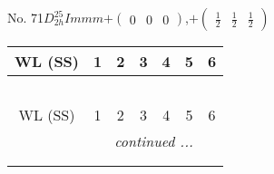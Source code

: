 \documentclass[fleqn,9pt,landscape]{jsarticle}
\begin{document}
\newpage
No. 71\quad$D_{2h}^{25}$\quad$Immm$\quad[ orthorhombic ]\quad$+\begin{pmatrix} 0 & 0 & 0 \end{pmatrix}$,\quad $+\begin{pmatrix} \frac{1}{2} & \frac{1}{2} & \frac{1}{2} \end{pmatrix}$
\begin{center}
\renewcommand{\arraystretch}{1.2}
\begin{longtable}{ccccccc}
 \hline \hline
WL (SS) & 1 & 2 & 3 & 4 & 5 & 6 \\ \hline \endfirsthead

\multicolumn{6}{l}{\tablename\ \thetable{}} \\
 \hline \hline
WL (SS) & 1 & 2 & 3 & 4 & 5 & 6 \\ \hline \endhead

 \hline \hline
\multicolumn{6}{r}{\footnotesize\it continued ...} \\ \endfoot

 \hline \hline
\multicolumn{6}{r}{} \\ \endlastfoot


\end{longtable}
\end{center}
\end{document}
